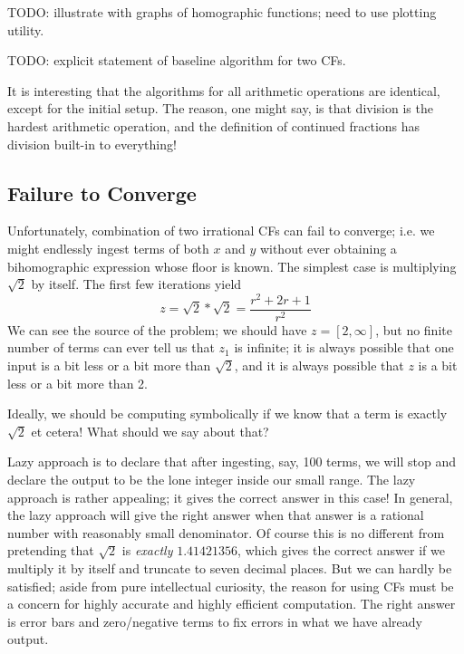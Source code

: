 \documentclass[11pt, oneside]{amsart}   	%
\begin{document}
TODO: illustrate with graphs of homographic functions; need to use plotting utility.

TODO: explicit statement of baseline algorithm for two CFs.

It is interesting that the algorithms for all arithmetic operations are identical, except for the initial setup. The reason, one might say, is that division is the hardest arithmetic operation, and the definition of continued fractions has division built-in to everything!

\subsection{Failure to Converge}
Unfortunately, combination of two irrational CFs can fail to converge; i.e. we might endlessly ingest terms of both $x$ and $y$ without ever obtaining a bihomographic expression whose floor is known. The simplest case is multiplying $\sqrt{2}$ by itself. The first few iterations yield
\begin{equation}%
z = \sqrt{2}*\sqrt{2} = \frac{r^2 + 2r + 1}{r^2}
\end{equation}
We can see the source of the problem; we should have $z=[2,\infty]$, but no finite number of terms can ever tell us that $z_1$ is infinite; it is always possible that one input is a bit less or a bit more than $\sqrt{2}$, and it is always possible that $z$ is a bit less or a bit more than 2.

Ideally, we should be computing symbolically if we know that a term is exactly $\sqrt{2}$ et cetera! What should we say about that?

Lazy approach is to declare that after ingesting, say, 100 terms, we will stop and declare the output to be the lone integer inside our small range. The lazy approach is rather appealing; it gives the correct answer in this case! In general, the lazy approach will give the right answer when that answer is a rational number with reasonably small denominator. Of course this is no different from pretending that $\sqrt{2}$ is \emph{exactly} $1.41421356$, which gives the correct answer if we multiply it by itself and truncate to seven decimal places.  But we can hardly be satisfied; aside from pure intellectual curiosity, the reason for using CFs must be a concern for highly accurate and highly efficient computation. The right answer is error bars and zero/negative terms to fix errors in what we have already output.
\end{document}
